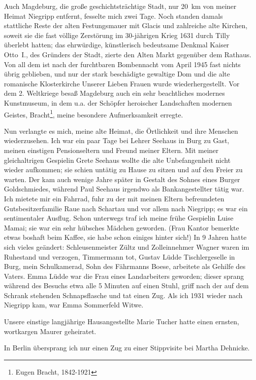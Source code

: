 Auch Magdeburg, die große geschichtsträchtige Stadt, nur 20~km von meiner Heimat Niegripp entfernt, fesselte mich zwei Tage. Noch standen damals stattliche Reste der alten Festungsmauer mit Glacis und zahlreiche alte Kirchen, soweit sie die fast völlige Zerstörung im 30-jährigen Krieg 1631 durch Tilly überlebt hatten; das ehrwürdige, künstlerisch bedeutsame Denkmal Kaiser Otto~I., des Gründers der Stadt, zierte den Alten Markt gegenüber dem Rathaus. Von all dem ist nach der furchtbaren Bombennacht vom April 1945 fast nichts übrig geblieben, und nur der stark beschädigte gewaltige Dom und die alte romanische Klosterkirche Unserer Lieben Frauen wurde wiederhergestellt. Vor dem 2. Weltkriege besaß Magdeburg auch ein sehr beachtliches modernes Kunstmuseum, in dem u.a. der Schöpfer heroischer Landschaften modernen Geistes, Bracht\footnote{Eugen Bracht, 1842-1921}, meine besondere Aufmerksamkeit erregte.

Nun verlangte es mich, meine alte Heimat, die Örtlichkeit und ihre Menschen wiederzusehen. Ich war ein paar Tage bei Lehrer Seehaus in Burg zu Gast, meinen einstigen Pensionseltern und Freund meiner Eltern. Mit meiner gleichaltrigen Gespielin Grete Seehaus wollte die alte Unbefangenheit nicht wieder aufkommen; sie schien untätig zu Hause zu sitzen und  auf den Freier zu warten. Der kam auch wenige Jahre später in Gestalt des Sohnes eines Burger Goldschmiedes, während Paul Seehaus irgendwo als Bankangestellter tätig war. Ich mietete mir ein Fahrrad, fuhr zu der mit meinen Eltern befreundeten Gutsbesitzerfamilie Raue nach Schartau und vor allem nach Niegripp; es war ein sentimentaler Ausflug. Schon unterwegs traf ich meine frühe Gespielin Luise Mamai; sie war ein sehr hübsches Mädchen geworden. (Frau Kantor bemerkte etwas boshaft beim Kaffee, sie habe schon einiges hinter sich!) In 9 Jahren hatte sich vieles geändert: Schleusenmeister Zültz und Zolleinnehmer Wagner waren im Ruhestand und verzogen, Timmermann tot, Gustav Lüdde Tischlergeselle in Burg, mein Schulkamerad, Sohn des Fährmanns Boese, arbeitete als Gehilfe des Vaters. Emma Lüdde war die Frau eines Landarbeiters geworden; dieser sprang während des Besuchs etwa alle 5 Minuten auf einen Stuhl, griff nach der auf dem Schrank stehenden Schnapsflasche und tat einen Zug. Als ich 1931 wieder nach Niegripp kam, war Emma Sommerfeld Witwe.

Unsere einstige langjährige Hausangestellte Marie Tucher hatte einen ernsten, wortkargen Maurer geheiratet.

In Berlin übersprang ich nur einen Zug zu einer Stippvisite bei Martha Dehnicke.

